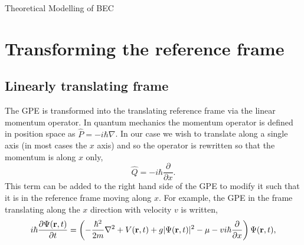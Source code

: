 \begin{chapter}{\label{cha:theoretical_model}Theoretical Modelling of BEC}
\section{\label{section:movframe} Transforming the reference frame}
	\subsection{\label{section:linearmovframe} Linearly translating frame}

	The GPE is transformed into the translating reference frame via the linear momentum operator. In quantum mechanics the momentum operator is defined in position space as $\hat{P} = -i\hbar\nabla$. In our case we wish to translate along a single axis (in most cases the $x$ axis) and so the operator is rewritten so that the momentum is along $x$ only,
	\begin{equation*}
	\hat{Q} = -i\hbar\frac{\partial}{\partial x}.
	\end{equation*}
	This term can be added to the right hand side of the GPE to modify it such that it is in the reference frame moving along $x$. For example, the GPE in the frame translating along the $x$ direction with velocity $v$ is written,
	\begin{equation}\label{eq:linearframegpe}
	i\hbar \frac{\partial\Psi({\bf r},t)}{\partial t} = \left(-\frac{\hbar^2}{2m}\nabla^2 + V({\bf r},t) + g|\Psi({\bf r},t)|^2 - \mu -vi\hbar\frac{\partial}{\partial x} \right ) \Psi({\bf r},t),
	\end{equation}



\end{chapter}
